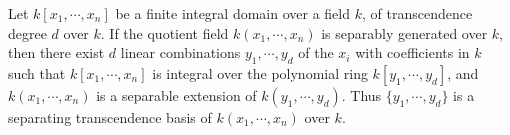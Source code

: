 Let $k[x_1, \cdots, x_n]$ be a finite integral domain over a field $k$, of transcendence degree $d$ over $k$. If the quotient field $k(x_1, \cdots, x_n)$ is separably generated over $k$, then there exist $d$ linear combinations $y_1, \cdots, y_d$ of the $x_i$ with coefficients in $k$ such that $k[x_1, \cdots, x_n]$ is integral over the polynomial ring $k[y_1, \cdots, y_d]$, and $k(x_1, \cdots, x_n)$ is a separable extension of $k(y_1, \cdots, y_d)$. Thus $\{y_1, \cdots, y_d\}$ is a separating transcendence basis of $k(x_1, \cdots, x_n)$ over $k$.
